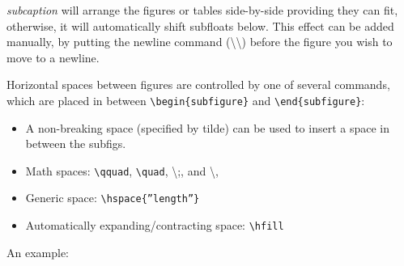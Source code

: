 \documentclass[10pt, a4paper]{article}
\begin{document}
\textsl{subcaption} will arrange the figures or tables side-by-side providing they can fit, otherwise, it will automatically shift subfloats below. This effect can be added manually, by putting the newline command (\textbackslash \textbackslash) before the figure you wish to move to a newline.

Horizontal spaces between figures are controlled by one of several commands, which are placed in between \texttt{\textbackslash begin\{subfigure\}} and \texttt{\textbackslash end\{subfigure\}}:
\begin{itemize}
	\item A non-breaking space (specified by tilde) can be used to insert a space in between the subfigs.
	\item Math spaces: \texttt{\textbackslash qquad}, \texttt{\textbackslash quad}, \textbackslash ;, and \textbackslash ,
	\item Generic space: \texttt{\textbackslash hspace\{''length''\}}
	\item Automatically expanding/contracting space: \texttt{\textbackslash hfill}
\end{itemize}
An example:
\end{document}
